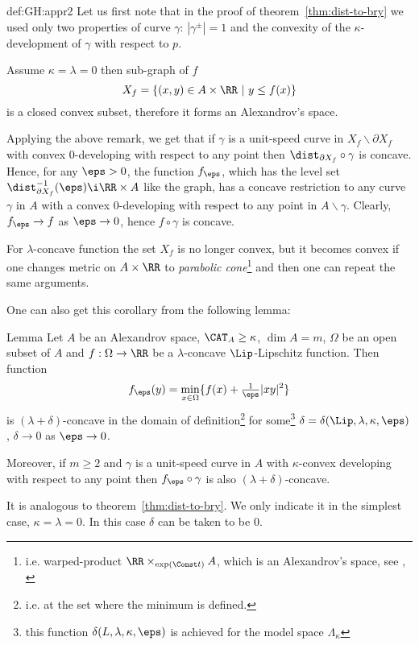 {\begin{subthm}{def:GH:appr2}
  Let us first note that in the proof of theorem~\ref{thm:dist-to-bry} we
used only two properties of curve $\gamma$:
$|\gamma^\pm|=1$ and the convexity of the $\kappa$-development of $\gamma$ with respect
to $p$.

Assume $\kappa=\lambda=0$ then sub-graph of $f$
$$X_f=\{(x,y)\in A\times\RR\ |\ y\le f(x)\}$$ 
is a closed convex subset, therefore it forms an Alexandrov's space.

Applying the above remark, we get that if $\gamma$ is a unit-speed curve in
$X_f\backslash \partial X_f$ with convex $0$-developing with respect to any
point then $\dist_{\partial X_f}\circ\gamma$ is concave.
 Hence, for any $\eps>0$, the function $f_\eps$, which has the level set $\dist_{\partial X_f}^{-1}(\eps)\i \RR\times A$ like the graph, has a concave restriction to any curve $\gamma$ in
$A$ with a convex $0$-developing with respect to any
point in $A\backslash\gamma$. 
Clearly, $f_\eps\to f$ as $\eps\to 0$, hence $f\circ\gamma$ is concave. 

For $\lambda$-concave function the set $X_f$ is no longer convex, but it becomes convex if one changes metric on $A\times\RR$ to \emph{parabolic cone}\footnote{\label{par-cone} i.e. warped-product
$\RR\times_{\exp(\Const t)} A$, which is an Alexandrov's space, see \cite[4.3.3]{BGP}, \cite{alexander-bishop:worps}} and then one can repeat the same arguments.\qeds


 One can also get this corollary from the following lemma:

\begin{thm}{Lemma}\label{f_eps}
Let $A$ be an Alexandrov space, $\CAT_A\ge\kappa$, $\dim A=m$, $\Omega$ be an open subset of $A$ and
 $f:\Omega\to\RR$ be a $\lambda$-concave $\Lip$-Lipschitz function.
Then function
$$f_\eps(y)=\min_{x\in\Omega}\{f(x)+\tfrac1\eps|x y|^2\}$$
is $(\lambda+\delta)$-concave in the domain of definition\footnote{i.e. at the set where the minimum is defined.} for some\footnote{this function $\delta(L,\lambda,\kappa,\eps)$ is achieved for the model space $\Lambda_\kappa$} $\delta=\delta(\Lip,\lambda,\kappa,\eps)$, $\delta\to0$ as $\eps\to 0$.

Moreover, if $m\ge 2$ and $\gamma$ is a unit-speed curve in $A$ with $\kappa$-convex developing with respect to any point then 
$f_\eps\circ\gamma$ is also $(\lambda+\delta)$-concave.
\end{thm}

It is analogous to theorem~\ref{thm:dist-to-bry}. 
We only indicate it in the simplest case, $\kappa=\lambda=0$. 
In this case $\delta$ can be taken to be $0$.


\end{subthm}}

